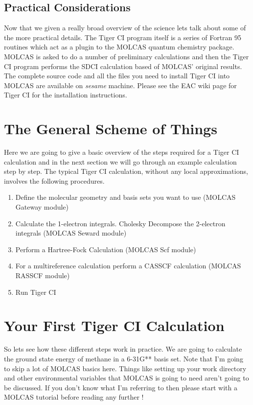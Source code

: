 \documentclass{article}
\begin{document}
\subsection{Practical Considerations}
Now that we given a really broad overview of the science lets talk about some of the more practical details. The Tiger CI program itself is a series of Fortran 95 routines which act as a plugin to the MOLCAS quantum chemistry package. MOLCAS is asked to do a number of preliminary calculations and then the Tiger CI program performs the SDCI calculation based of MOLCAS' original results. The complete source code and all the files you need to install Tiger CI into MOLCAS are available on \emph{sesame} machine. Please see the EAC wiki page for Tiger CI for the installation instructions. 

\section{The General Scheme of Things}
Here we are going to give a basic overview of the steps required for a Tiger CI calculation and in the next section we will go through an example calculation step by step. The typical Tiger CI calculation, without any local approximations, involves the following procedures. 

\begin{enumerate}
 \item Define the molecular geometry and basis sets you want to use (MOLCAS Gateway module)
 \item Calculate the 1-electron integrals. Cholesky Decompose the 2-electron integrals (MOLCAS Seward module)
 \item Perform a Hartree-Fock Calculation (MOLCAS Scf module)
 \item For a multireference calculation perform a CASSCF calculation (MOLCAS RASSCF module) 
 \item Run Tiger CI
\end{enumerate}

\section{Your First Tiger CI Calculation}
So lets see how these different steps work in practice. We are going to calculate the ground state energy of methane in a 6-31G** basis set. Note that I'm going to skip a lot of MOLCAS basics here. Things like setting up your work directory and other environmental variables that MOLCAS is going to need aren't going to be discussed. If you don't know what I'm referring to then please start with a MOLCAS tutorial before reading any further !
\end{document}
